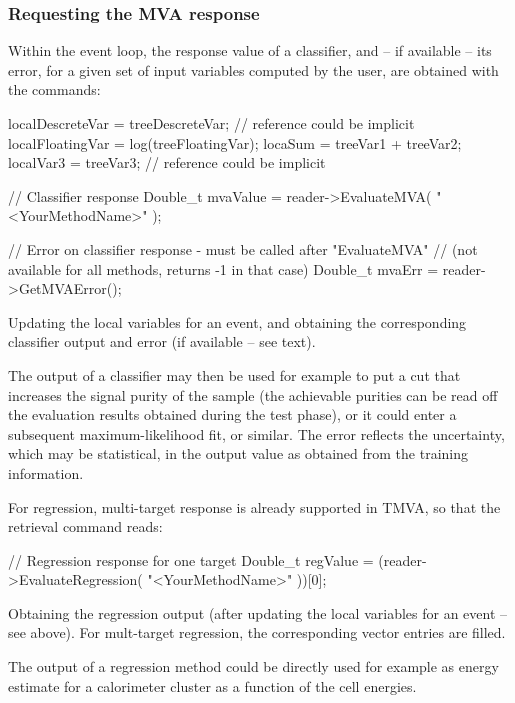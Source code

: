 \subsubsection{Requesting the MVA response}

Within the event loop, the response value of a classifier, and -- if available -- 
its error, for a given set of input variables computed by the user, are obtained 
with the commands:
\begin{codeexample}
\begin{tmvacode}
localDescreteVar  = treeDescreteVar;       // reference could be implicit
localFloatingVar  = log(treeFloatingVar);
locaSum           = treeVar1 + treeVar2;
localVar3         = treeVar3;              // reference could be implicit

// Classifier response
Double_t mvaValue = reader->EvaluateMVA( "<YourMethodName>" );

// Error on classifier response - must be called after "EvaluateMVA"
// (not available for all methods, returns -1 in that case)
Double_t mvaErr   = reader->GetMVAError();
\end{tmvacode}
\caption[.]{\codeexampleCaptionSize Updating the local variables for an event, 
            and obtaining the corresponding classifier output and error 
            (if available -- see text). }
\end{codeexample}
The output of a classifier may then be used for example to put a cut that increases the 
signal purity of the sample (the achievable purities can be read off the evaluation
results obtained during the test phase), or it could enter a subsequent 
maximum-likelihood fit, or similar. The error reflects the uncertainty, which 
may be statistical, in the output value as obtained from the training information. 

For regression, multi-target response is already supported in TMVA, so that the 
retrieval command reads:
\begin{codeexample}
\begin{tmvacode}
// Regression response for one target
Double_t regValue = (reader->EvaluateRegression( "<YourMethodName>" ))[0];
\end{tmvacode}
\caption[.]{\codeexampleCaptionSize Obtaining the regression output (after 
            updating the local variables for an event -- see above). For mult-target 
            regression, the corresponding vector entries are filled.}
\end{codeexample}
The output of a regression method could be directly used for example as energy estimate 
for a calorimeter cluster as a function of the cell energies. 

